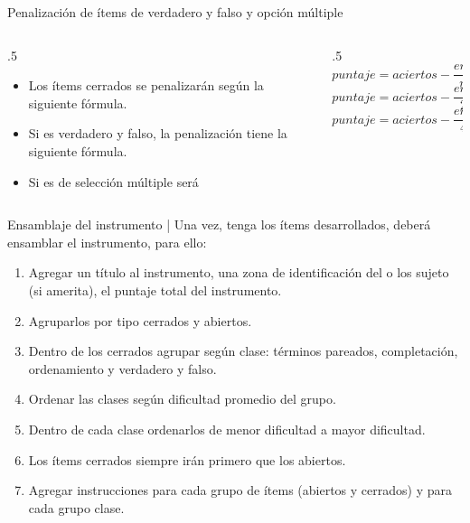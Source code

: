\documentclass[11pt, aspectratio=169, xcolor=table,hyphens]{beamer}
\begin{document}
\begin{frame}{Penalización de ítems de verdadero y falso y opción múltiple}
	\begin{columns}
		\begin{column}{.5\linewidth}
			\begin{itemize}
				\item Los ítems cerrados se penalizarán según la siguiente fórmula.
				\item Si es verdadero y falso, la penalización tiene la siguiente fórmula.
				\item Si es de selección múltiple será
			\end{itemize}

		\end{column}
		\begin{column}{.5\linewidth}
			\begin{equation}
				puntaje = aciertos - \frac{errores}{n-1}
			\end{equation}
			\begin{equation}
				puntaje = aciertos - \frac{errores}{2-1}
			\end{equation}
			\begin{equation}
				puntaje = aciertos - \frac{errores}{4-1}
			\end{equation}
		\end{column}
	\end{columns}
\end{frame}


\begin{frame}{Ensamblaje del instrumento |}
	Una vez, tenga los ítems desarrollados, deberá ensamblar el instrumento, para ello:
	\begin{enumerate}[<+->]
		\item Agregar un título al instrumento, una zona de identificación del o los sujeto (si amerita), el puntaje total del instrumento.
		\item Agruparlos por tipo cerrados y abiertos.
		\item Dentro de los cerrados agrupar según clase: términos pareados, completación, ordenamiento y verdadero y falso.
		\item Ordenar las clases según dificultad promedio del grupo.
		\item Dentro de cada clase ordenarlos de menor dificultad a mayor dificultad.
		\item Los ítems cerrados siempre irán primero que los abiertos.
		\item Agregar instrucciones para cada grupo de ítems (abiertos y cerrados) y para cada grupo clase.
	\end{enumerate}
\end{frame}
\end{document}
